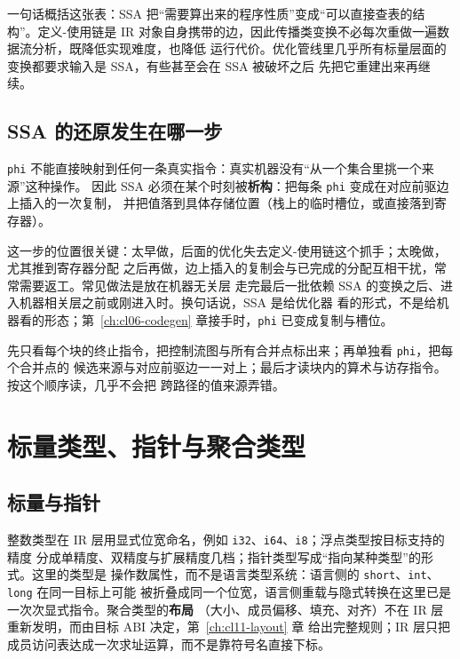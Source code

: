 \documentclass[12pt,a4paper,fontset=fandol]{ctexbook}
\newcommand{\Tp}[1]{\texttt{#1}}
\begin{document}
一句话概括这张表：SSA 把“需要算出来的程序性质”变成“可以直接查表的结构”。定义-使用链是
IR 对象自身携带的边，因此传播类变换不必每次重做一遍数据流分析，既降低实现难度，也降低
运行代价。优化管线里几乎所有标量层面的变换都要求输入是 SSA，有些甚至会在 SSA 被破坏之后
先把它重建出来再继续。

\subsection{SSA 的还原发生在哪一步}\label{sec:cl04-ssa-destruct}

\Tp{phi} 不能直接映射到任何一条真实指令：真实机器没有“从一个集合里挑一个来源”这种操作。
因此 SSA 必须在某个时刻被\textbf{析构}：把每条 \Tp{phi} 变成在对应前驱边上插入的一次复制，
并把值落到具体存储位置（栈上的临时槽位，或直接落到寄存器）。

这一步的位置很关键：太早做，后面的优化失去定义-使用链这个抓手；太晚做，尤其推到寄存器分配
之后再做，边上插入的复制会与已完成的分配互相干扰，常常需要返工。常见做法是放在机器无关层
走完最后一批依赖 SSA 的变换之后、进入机器相关层之前或刚进入时。换句话说，SSA 是给优化器
看的形式，不是给机器看的形态；第~\ref{ch:cl06-codegen} 章接手时，\Tp{phi} 已变成复制与槽位。

\begin{bestpractice}[title={读 SSA 的顺序}]
先只看每个块的终止指令，把控制流图与所有合并点标出来；再单独看 \Tp{phi}，把每个合并点的
候选来源与对应前驱边一一对上；最后才读块内的算术与访存指令。按这个顺序读，几乎不会把
跨路径的值来源弄错。
\end{bestpractice}

\section{标量类型、指针与聚合类型}\label{sec:cl04-types}

\subsection{标量与指针}\label{sec:cl04-types-scalar}

整数类型在 IR 层用显式位宽命名，例如 \Tp{i32}、\Tp{i64}、\Tp{i8}；浮点类型按目标支持的精度
分成单精度、双精度与扩展精度几档；指针类型写成“指向某种类型”的形式。这里的类型是
操作数属性，而不是语言类型系统：语言侧的 \Tp{short}、\Tp{int}、\Tp{long} 在同一目标上可能
被折叠成同一个位宽，语言侧重载与隐式转换在这里已是一次次显式指令。聚合类型的\textbf{布局}
（大小、成员偏移、填充、对齐）不在 IR 层重新发明，而由目标 ABI 决定，第~\ref{ch:cl11-layout} 章
给出完整规则；IR 层只把成员访问表达成一次求址运算，而不是靠符号名直接下标。
\end{document}
